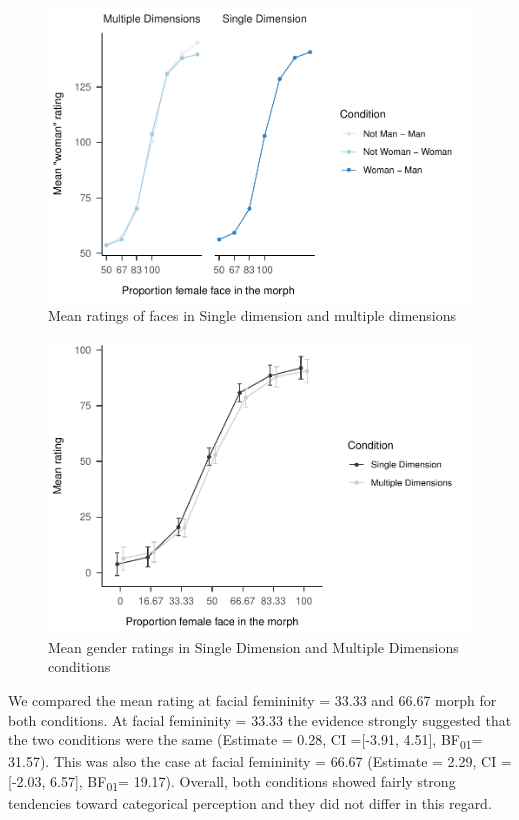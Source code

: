 \documentclass[
  man]{apa7}
\begin{document}
\begin{figure}
\centering
\includegraphics{resp_opts_manus23022_files/figure-latex/descriptives-two-1.pdf}
\caption{\label{fig:descriptives-two}Mean ratings of faces in Single dimension and multiple dimensions}
\end{figure}

\begin{figure}
\centering
\includegraphics{resp_opts_manus23022_files/figure-latex/exp-two-inf-1.pdf}
\caption{\label{fig:exp-two-inf}Mean gender ratings in Single Dimension and Multiple Dimensions conditions}
\end{figure}

We compared the mean rating at facial femininity = 33.33 and 66.67 morph for both conditions. At facial femininity = 33.33 the evidence strongly suggested that the two conditions were the same
(Estimate = 0.28, CI ={[}-3.91, 4.51{]}, BF\textsubscript{01}= 31.57). This was also the case at facial femininity = 66.67
(Estimate = 2.29, CI ={[}-2.03, 6.57{]}, BF\textsubscript{01}= 19.17). Overall, both conditions showed fairly strong tendencies toward categorical perception and they did not differ in this regard.
\end{document}
